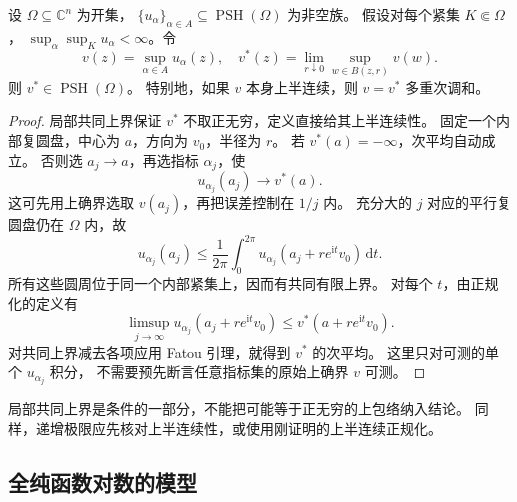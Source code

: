 \begin{proposition}[上包络的上半连续正规化]\label{b3:prop:29-psh-envelope}
设 \(\Omega\subseteq\mathbb C^n\) 为开集，
\(\{u_\alpha\}_{\alpha\in A}\subseteq\operatorname{PSH}(\Omega)\) 为非空族。
假设对每个紧集 \(K\Subset\Omega\)，
\(\sup_\alpha\sup_Ku_\alpha<\infty\)。令
\[
 v(z)=\sup_{\alpha\in A}u_\alpha(z),\quad
 v^*(z)=\lim_{r\downarrow0}\sup_{w\in B(z,r)}v(w).
\]
则 \(v^*\in\operatorname{PSH}(\Omega)\)。
特别地，如果 \(v\) 本身上半连续，则 \(v=v^*\) 多重次调和。
\end{proposition}
\begin{proof}
局部共同上界保证 \(v^*\) 不取正无穷，定义直接给其上半连续性。
固定一个内部复圆盘，中心为 \(a\)，方向为 \(v_0\)，半径为 \(r\)。
若 \(v^*(a)=-\infty\)，次平均自动成立。
否则选 \(a_j\to a\)，再选指标 \(\alpha_j\)，使
\[
 u_{\alpha_j}(a_j)\longrightarrow v^*(a).
\]
这可先用上确界选取 \(v(a_j)\)，再把误差控制在 \(1/j\) 内。
充分大的 \(j\) 对应的平行复圆盘仍在 \(\Omega\) 内，故
\[
 u_{\alpha_j}(a_j)
 \le\frac1{2\pi}\int_0^{2\pi}
             u_{\alpha_j}(a_j+re^{\mathrm it}v_0)\,\mathrm dt.
\]
所有这些圆周位于同一个内部紧集上，因而有共同有限上界。
对每个 \(t\)，由正规化的定义有
\[
 \limsup_{j\to\infty}u_{\alpha_j}(a_j+re^{\mathrm it}v_0)
 \le v^*(a+re^{\mathrm it}v_0).
\]
对共同上界减去各项应用 Fatou 引理，就得到 \(v^*\) 的次平均。
这里只对可测的单个 \(u_{\alpha_j}\) 积分，
不需要预先断言任意指标集的原始上确界 \(v\) 可测。
\end{proof}

局部共同上界是条件的一部分，不能把可能等于正无穷的上包络纳入结论。
同样，递增极限应先核对上半连续性，或使用刚证明的上半连续正规化。

\subsection{全纯函数对数的模型}
\label{b3:subsec:290303}

